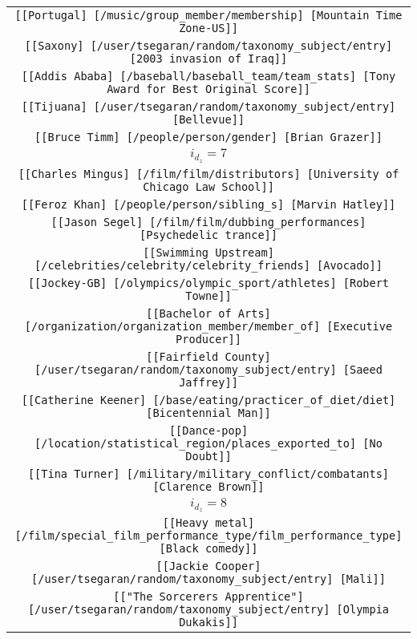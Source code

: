\begin{longtable}{|c|}
    \texttt{[[Portugal] [/music/group\_member/membership] [Mountain Time Zone-US]]}\\
    \texttt{[[Saxony] [/user/tsegaran/random/taxonomy\_subject/entry] [2003 invasion of Iraq]]}\\
    \texttt{[[Addis Ababa] [/baseball/baseball\_team/team\_stats] [Tony Award for Best Original Score]]}\\
    \texttt{[[Tijuana] [/user/tsegaran/random/taxonomy\_subject/entry] [Bellevue]]}\\
    \texttt{[[Bruce Timm] [/people/person/gender] [Brian Grazer]]}\\
    \hline 
    \rowcolor[HTML]{EFEFEF} 
    \textsc{$i_{d_z}=7$}\\ \hline 
    \texttt{[[Charles Mingus] [/film/film/distributors] [University of Chicago Law School]]}\\
    \texttt{[[Feroz Khan] [/people/person/sibling\_s] [Marvin Hatley]]}\\
    \texttt{[[Jason Segel] [/film/film/dubbing\_performances] [Psychedelic trance]]}\\
    \texttt{[[Swimming Upstream] [/celebrities/celebrity/celebrity\_friends] [Avocado]]}\\
    \texttt{[[Jockey-GB] [/olympics/olympic\_sport/athletes] [Robert Towne]]}\\
    \texttt{[[Bachelor of Arts] [/organization/organization\_member/member\_of] [Executive Producer]]}\\
    \texttt{[[Fairfield County] [/user/tsegaran/random/taxonomy\_subject/entry] [Saeed Jaffrey]]}\\
    \texttt{[[Catherine Keener] [/base/eating/practicer\_of\_diet/diet] [Bicentennial Man]]}\\
    \texttt{[[Dance-pop] [/location/statistical\_region/places\_exported\_to] [No Doubt]]}\\
    \texttt{[[Tina Turner] [/military/military\_conflict/combatants] [Clarence Brown]]}\\
    \hline 
    \rowcolor[HTML]{EFEFEF} 
    \textsc{$i_{d_z}=8$}\\ \hline 
    \texttt{[[Heavy metal] [/film/special\_film\_performance\_type/film\_performance\_type] [Black comedy]]}\\
    \texttt{[[Jackie Cooper] [/user/tsegaran/random/taxonomy\_subject/entry] [Mali]]}\\
    \texttt{[["The Sorcerers Apprentice"] [/user/tsegaran/random/taxonomy\_subject/entry] [Olympia Dukakis]]}\\

\end{longtable}
